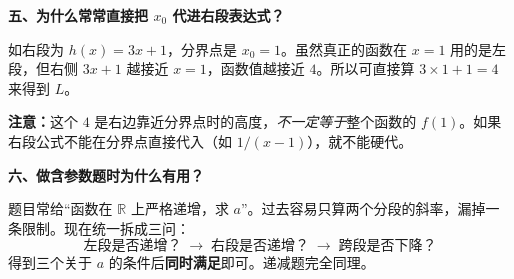 \clearpage
\begin{explanationbox}
\textbf{\textcolor{CExplanation}{五、为什么常常直接把 $x_0$ 代进右段表达式？}}



如右段为 $h(x)=3x+1$，分界点是 $x_0=1$。虽然真正的函数在 $x=1$ 用的是左段，但右侧 $3x+1$ 越接近 $x=1$，函数值越接近 $4$。所以可直接算 $3\times1+1=4$ 来得到 $L$。

\textbf{注意：}这个 $4$ 是右边靠近分界点时的高度，\emph{不一定等于}整个函数的 $f(1)$。如果右段公式不能在分界点直接代入（如 $1/(x-1)$），就不能硬代。

\medskip
\textbf{\textcolor{CExplanation}{六、做含参数题时为什么有用？}}

题目常给“函数在 $\mathbb R$ 上严格递增，求 $a$”。过去容易只算两个分段的斜率，漏掉一条限制。现在统一拆成三问：
\[
 \boxed{\ \text{左段是否递增？}\;\longrightarrow\;\text{右段是否递增？}\;\longrightarrow\;\text{跨段是否下降？}\ }
\]
得到三个关于 $a$ 的条件后\textbf{同时满足}即可。递减题完全同理。
\end{explanationbox}
